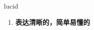 
\begin{frame}
{\huge lucid}
\begin{center}
\begin{enumerate}\Large
  \item \textbf{表达清晰的，简单易懂的}
\end{enumerate}
\end{center}
\end{frame}
